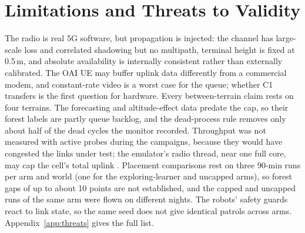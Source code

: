 \section{Limitations and Threats to Validity}
\label{sec:limits}

The radio is real 5G software, but propagation is injected: the channel has
large-scale loss and correlated shadowing but no multipath, terminal height is
fixed at 0.5\,m, and absolute availability is internally consistent rather than
externally calibrated. The OAI UE may buffer uplink data differently from a
commercial modem, and constant-rate video is a worst case for the queue;
whether C1 transfers is the first question for hardware. Every
between-terrain claim rests on four terrains. The forecasting and
altitude-effect data predate the cap, so their forest labels are partly queue
backlog, and the dead-process rule removes only about half of the dead cycles
the monitor recorded. Throughput was not measured with active probes during the
campaigns, because they would have congested the links under test; the
emulator's radio thread, near one full core, may cap the cell's total uplink
.
Placement comparisons rest on three 90-min runs per arm and world (one for
the exploring-learner and uncapped arms), so
forest gaps of up to about 10 points are not established, and the capped and
uncapped runs of the same arm were flown on different nights. The robots'
safety guards react to link state, so the same seed does not give identical
patrols across arms. Appendix~\ref{app:threats} gives the full list.
